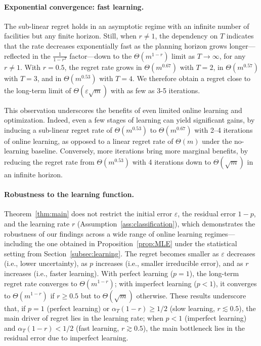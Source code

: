 \documentclass[nonblindrev]{informs3noheader}
\begin{document}
\paragraph{Exponential convergence: fast learning.}

The sub-linear regret holds in an asymptotic regime with an infinite number of facilities but any finite horizon. Still, when $r\neq1$, the dependency on $T$ indicates that the rate decreases exponentially fast as the planning horizon grows longer---reflected in the $\frac{1}{1-r^{T}}$ factor---down to the $\Theta(m^{1-r})$ limit as $T\to\infty$, for any $r\neq1$. With $r=0.5$, the regret rate grows in $\Theta(m^{0.67})$ with $T=2$, in $\Theta(m^{0.57})$ with $T=3$, and in $\Theta(m^{0.53})$ with $T=4$. We therefore obtain a regret close to the long-term limit of $\Theta(\varepsilon\sqrt{m})$ with as few as 3-5 iterations.

This observation underscores the benefits of even limited online learning and optimization. Indeed, even a few stages of learning can yield significant gains, by inducing a sub-linear regret rate of $\Theta(m^{0.53})$ to $\Theta(m^{0.67})$ with 2--4 iterations of online learning,  as opposed to a linear regret rate of $\Theta(m)$ under the no-learning baseline. Conversely, more iterations bring more marginal benefits, by reducing the regret rate from $\Theta(m^{0.53})$ with 4 iterations down to $\Theta(\sqrt{m})$ in an infinite horizon.

\paragraph{Robustness to the learning function.}

Theorem~\ref{thm:main} does not restrict the initial error $\varepsilon$, the residual error $1-p$, and the learning rate  $r$ (Assumption~\ref{ass:classification}), which demonstrates the robustness of our findings across a wide range of online learning regimes---including the one obtained in Proposition~\ref{prop:MLE} under the statistical setting from Section~\ref{subsec:learning}. The regret becomes smaller as $\varepsilon$ decreases (i.e., lower uncertainty), as $p$ increases (i.e., smaller irreducible error), and as $r$ increases (i.e., faster learning). With perfect learning ($p=1$), the long-term regret rate converges to $\Theta\left(m^{1-r}\right)$; with imperfect learning ($p<1$), it converges to $\Theta\left(m^{1-r}\right)$ if $r\geq0.5$ but to $\Theta(\sqrt m)$ otherwise. These results underscore that, if $p=1$ (perfect learning) or $\alpha_T(1-r)\geq1/2$ (slow learning, $r\lesssim0.5$), the main driver of regret lies in the learning rate; when $p<1$ (imperfect learning) and $\alpha_T(1-r)<1/2$ (fast learning, $r\gtrsim0.5$), the main bottleneck lies in the residual error due to imperfect learning.
\end{document}
